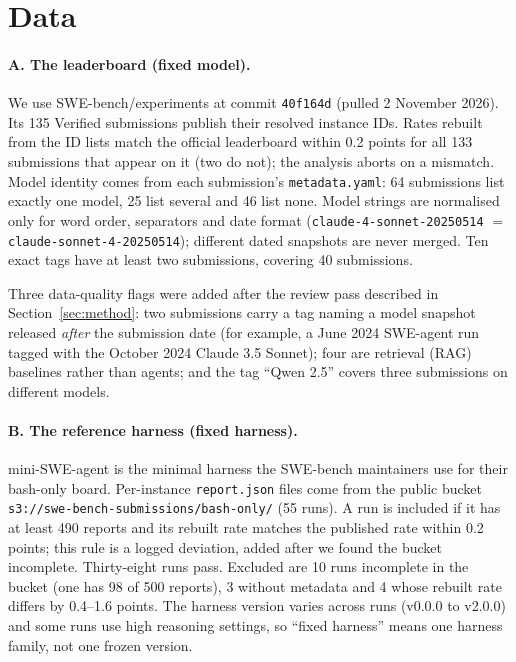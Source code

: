 \documentclass[10pt]{article}
\begin{document}
\section{Data}
\label{sec:data}

\paragraph{A. The leaderboard (fixed model).} We use SWE-bench/experiments at commit \texttt{40f164d} (pulled 2 November 2026). Its 135 Verified submissions publish their resolved instance IDs. Rates rebuilt from the ID lists match the official leaderboard within 0.2 points for all 133 submissions that appear on it (two do not); the analysis aborts on a mismatch. Model identity comes from each submission's \texttt{metadata.yaml}: 64 submissions list exactly one model, 25 list several and 46 list none. Model strings are normalised only for word order, separators and date format (\texttt{claude-4-sonnet-20250514} $=$ \texttt{claude-sonnet-4-20250514}); different dated snapshots are never merged. Ten exact tags have at least two submissions, covering 40 submissions.

Three data-quality flags were added after the review pass described in Section~\ref{sec:method}: two submissions carry a tag naming a model snapshot released \emph{after} the submission date (for example, a June 2024 SWE-agent run tagged with the October 2024 Claude 3.5 Sonnet); four are retrieval (RAG) baselines rather than agents; and the tag ``Qwen 2.5'' covers three submissions on different models.

\paragraph{B. The reference harness (fixed harness).} mini-SWE-agent is the minimal harness the SWE-bench maintainers use for their bash-only board. Per-instance \texttt{report.json} files come from the public bucket \texttt{s3://swe-bench-submissions/bash-only/} (55 runs). A run is included if it has at least 490 reports and its rebuilt rate matches the published rate within 0.2 points; this rule is a logged deviation, added after we found the bucket incomplete. Thirty-eight runs pass. Excluded are 10 runs incomplete in the bucket (one has 98 of 500 reports), 3 without metadata and 4 whose rebuilt rate differs by 0.4--1.6 points. The harness version varies across runs (v0.0.0 to v2.0.0) and some runs use high reasoning settings, so ``fixed harness'' means one harness family, not one frozen version.
\end{document}
